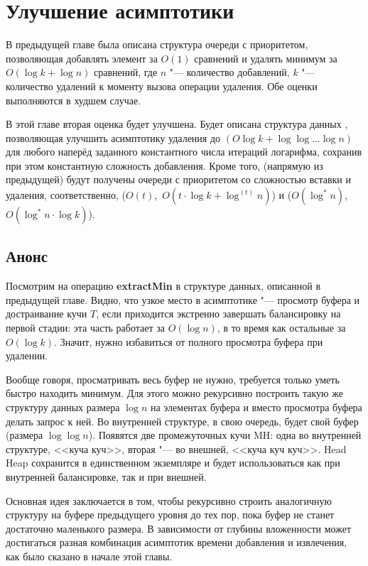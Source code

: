 \chapter{Улучшение асимптотики} \label{chapt-ch}

В предыдущей главе была описана структура очереди с приоритетом, позволяющая
добавлять элемент за $O(1)$ сравнений и удалять минимум за $O(\log k + \log n)$
сравнений, где $n$ "--- количество добавлений, $k$ "--- количество удалений
к моменту вызова операции удаления. Обе оценки выполняются в худшем случае.

В этой главе вторая оценка будет улучшена.  Будет описана структура данных \CH,
позволяющая улучшить асимптотику удаления до $(O\log k + \log \log \dots \log n)$
для любого наперёд заданного константного числа итераций логарифма, сохранив при
этом константную сложность добавления. Кроме того, (напрямую из предыдущей)
будут получены очереди с приоритетом со сложностью вставки и удаления,
соответственно, ($O(t)$,~$O(t \cdot \log k + \log ^{(t)} n)$) и
($O(\log^* n)$,~$O(\log^* n \cdot \log k)$).



\section*{Анонс}

Посмотрим на операцию \textbf{extractMin} в структуре данных, описанной в предыдущей
главе. Видно, что узкое место в асимптотике "--- просмотр буфера и достраивание
кучи $T$, если приходится экстренно завершать балансировку на первой стадии:
эта часть работает за $O(\log n)$, в то время как остальные за $O(\log k)$.
Значит, нужно избавиться от полного просмотра буфера при удалении.

Вообще говоря, просматривать весь буфер не нужно, требуется только уметь быстро
находить минимум. Для этого можно рекурсивно построить такую же структуру данных
размера $\log n$ на элементах буфера и вместо просмотра буфера делать запрос к ней.
Во внутренней структуре, в свою очередь, будет свой буфер (размера $\log \log n$).
Появятся две промежуточных кучи MH: одна во внутренней структуре, <<куча куч>>,
вторая "--- во внешней, <<куча куч куч>>. Head Heap сохранится в единственном
экземпляре и будет использоваться как при внутренней балансировке, так и при внешней.

Основная идея \CH заключается в том, чтобы рекурсивно строить аналогичную
структуру на буфере предыдущего уровня до тех пор, пока буфер не станет достаточно
маленького размера. В зависимости от глубины вложенности может достигаться
разная комбинация асимптотик времени добавления и извлечения, как было сказано
в начале этой главы.

